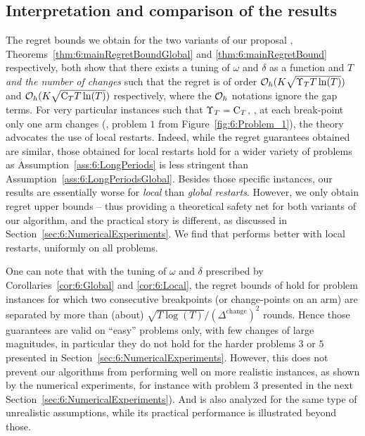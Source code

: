 \subsection{Interpretation and comparison of the results}
\label{sub:6:interpretationRegretBounds}

The regret bounds we obtain for the two variants of our proposal \GLRklUCB{},
Theorems~\ref{thm:6:mainRegretBoundGlobal} and \ref{thm:6:mainRegretBound} respectively,
both show that there exists a tuning of $\omega$ and $\delta$ as a function and $T$ \emph{and the number of changes} such that the regret is of order $\mathcal{O}_h(K\sqrt{\Upsilon_T T \ln(T)})$ and $\mathcal{O}_h(K\sqrt{\mathrm{C}_T T \ln(T)})$ respectively, where the $\mathcal{O}_h$ notations ignore the gap terms.
%
For very particular instances such that $\Upsilon_T = \mathrm{C}_T$, \ie, at each break-point only one arm changes (\eg, problem $1$ from Figure~\ref{fig:6:Problem_1}), the theory advocates the use of local restarts.
%
Indeed, while the regret guarantees obtained are similar, those obtained for local restarts hold for a wider variety of problems as Assumption~\ref{ass:6:LongPeriods} is less stringent than Assumption~\ref{ass:6:LongPeriodsGlobal}.
%
Besides those specific instances, our results are essentially worse for \emph{local} than \emph{global restarts}. However, we only obtain regret upper bounds -- thus providing a theoretical safety net for both variants of our algorithm, and the practical story is different, as discussed in Section~\ref{sec:6:NumericalExperiments}.
We find that \GLRklUCB{} performs better with local restarts, uniformly on all problems.

One can note that with the tuning of $\omega$ and $\delta$ prescribed by Corollaries~\ref{cor:6:Global} and \ref{cor:6:Local}, the regret bounds of \GLRklUCB{} hold for problem instances for which two consecutive breakpoints (or change-points on an arm) are separated by more than (about) $\sqrt{T\log(T)}/(\Delta^{\text{change}})^2$ rounds.
Hence those guarantees are valid on ``easy'' problems only, with few changes of large magnitudes, in particular they do not hold for the harder problems $3$ or $5$ presented in Section~\ref{sec:6:NumericalExperiments}.
%
However, this does not prevent our algorithms from performing well on more realistic instances, as shown by the numerical experiments,
for instance with problem $3$ presented in the next Section~\ref{sec:6:NumericalExperiments}).
%
And \MUCB{} \cite{CaoZhenKvetonXie18} is also analyzed for the same type of unrealistic assumptions, while its practical performance is illustrated beyond those.


